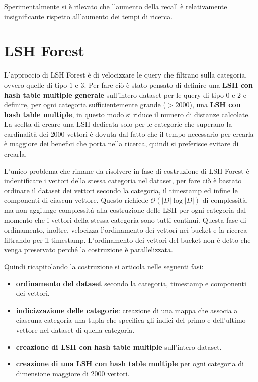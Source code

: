 Sperimentalmente si \`e rilevato che l’aumento della recall \`e relativamente insignificante rispetto all'aumento dei tempi di ricerca.

\section{LSH Forest}
L'approccio di LSH Forest è di velocizzare le query che filtrano sulla categoria,
ovvero quelle di tipo $1$ e $3$. Per fare ciò è stato pensato di definire una \textbf{LSH
con hash table multiple generale} sull'intero dataset per le query di tipo $0$ e $2$ e definire,
per ogni categoria sufficientemente grande ($>2000$), una \textbf{LSH con hash table multiple}, in questo 
modo si riduce il numero di distanze calcolate. La scelta di creare 
una LSH dedicata solo per le categorie che superano la cardinalità dei $2000$ vettori 
è dovuta dal fatto che il tempo necessario per crearla è maggiore dei benefici 
che porta nella ricerca, quindi si preferisce evitare di crearla.

L'unico problema che rimane da risolvere in fase di costruzione di LSH Forest è 
indentificare i vettori della stessa categoria nel dataset, per fare ciò è bastato 
ordinare il dataset dei vettori secondo la categoria, il timestamp ed infine 
le componenti di ciascun vettore. Questo richiede $\mathcal{O}(|D|\log |D|)$ di 
complessità, ma non aggiunge complessità alla costruzione delle LSH per ogni categoria 
dal momento che i vettori della stessa categoria sono tutti continui. Questa 
fase di ordinamento, inoltre, velocizza l'ordinamento dei vettori nei bucket e la ricerca 
filtrando per il timestamp. L'ordinamento dei vettori del bucket non è detto 
che venga preservato perché la costruzione è parallelizzata.

Quindi ricapitolando la costruzione si articola nelle seguenti fasi:
\begin{itemize}
    \item \textbf{ordinamento del dataset} secondo la categoria, timestamp e componenti dei vettori.
    \item \textbf{indicizzazione delle categorie}: creazione di una mappa che 
    associa a ciascuna categoria una tupla che specifica gli indici 
    del primo e dell'ultimo vettore nel dataset di quella categoria.
    \item \textbf{creazione di LSH con hash table multiple} sull'intero dataset.
    \item \textbf{creazione di una LSH con hash table multiple} per ogni categoria 
    di dimensione maggiore di $2000$ vettori.
\end{itemize}

